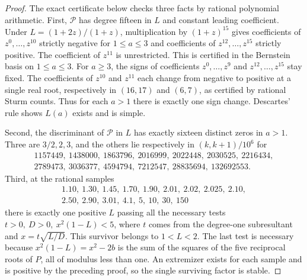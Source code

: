 \documentclass[11pt]{article}
\begin{document}
\begin{proof}
The exact certificate below checks three facts by rational
polynomial arithmetic. First, \(\mathcal P\) has degree fifteen in \(L\)
and constant leading coefficient. Under
\(L=(1+2z)/(1+z)\), multiplication by \((1+z)^{15}\)
gives coefficients of \(z^0,\ldots,z^{10}\) strictly negative
for \(1\le a\le3\) and coefficients of \(z^{12},\ldots,z^{15}\)
strictly positive. The coefficient of \(z^{11}\) is unrestricted.
This is certified in the Bernstein basis on \(1\le a\le3\).
For \(a\ge3\), the signs of coefficients \(z^0,\ldots,z^9\)
and \(z^{12},\ldots,z^{15}\) stay fixed. The coefficients of
\(z^{10}\) and \(z^{11}\) each change from negative to positive
at a single real root, respectively in \((16,17)\) and \((6,7)\),
as certified by rational Sturm counts. Thus for each \(a>1\)
there is exactly one sign change. Descartes' rule shows
\(L(a)\) exists and is simple.

Second, the discriminant of \(\mathcal P\) in \(L\) has exactly sixteen
distinct zeros in \(a>1\). Three are \(3/2,2,3\), and the
others lie respectively in \((k,k+1)/10^6\) for
\[
 \begin{gathered}
 1157449,\ 1438000,\ 1863796,\ 2016999,\ 2022448,\ 2030525,\ 2216434,\\
 2789473,\ 3036377,\ 4594794,\ 7212547,\ 28835694,\ 132692553 .
 \end{gathered}
\]
Third, at the rational samples
\[
 \begin{gathered}
 1.10,\ 1.30,\ 1.45,\ 1.70,\ 1.90,\ 2.01,\ 2.02,\ 2.025,\ 2.10,\\
 2.50,\ 2.90,\ 3.01,\ 4.1,\ 5,\ 10,\ 30,\ 150
 \end{gathered}
\]
there is exactly one positive \(L\) passing all the necessary
tests \(t>0,\ D>0,\ x^2(1-L)<5\), where \(t\) comes from the
degree-one subresultant and \(x=t\sqrt{L/D}\).
This survivor belongs to \(1<L<2\). The last test is necessary
because \(x^2(1-L)=x^2-2b\) is the sum of the squares of the
five reciprocal roots of \(P\), all of modulus less than one.
An extremizer exists for each sample and is positive by the
preceding proof, so the single surviving factor is stable.


\end{proof}
\end{document}
